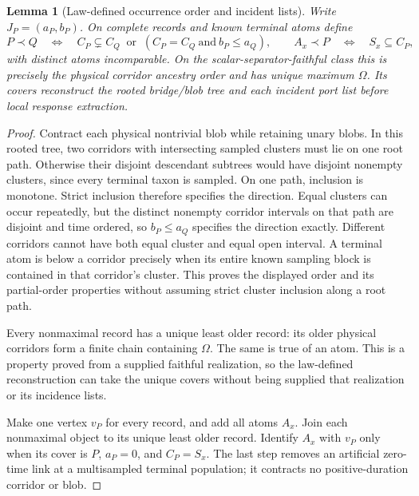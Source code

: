 \documentclass[11pt]{article}
\newtheorem{lemma}[theorem]{Lemma}
\begin{document}
\begin{lemma}[Law-defined occurrence order and incident lists]
\label{lem:supp-occurrence-incidence}
Write $J_P=(a_P,b_P)$.  On complete records and known terminal atoms define
\[
P\prec Q\quad\Longleftrightarrow\quad
C_P\subsetneq C_Q\ \text{ or }\
(C_P=C_Q\ \text{and}\ b_P\le a_Q),
\qquad
A_x\prec P\quad\Longleftrightarrow\quad S_x\subseteq C_P,
\]
with distinct atoms incomparable.  On the scalar-separator-faithful class this is precisely the physical corridor ancestry order and has unique maximum $\Omega$.  Its covers reconstruct the rooted bridge/blob tree and each incident port list before local response extraction.
\end{lemma}

\begin{proof}
Contract each physical nontrivial blob while retaining unary blobs.  In this rooted tree, two corridors with intersecting sampled clusters must lie on one root path.  Otherwise their disjoint descendant subtrees would have disjoint nonempty clusters, since every terminal taxon is sampled.  On one path, inclusion is monotone.  Strict inclusion therefore specifies the direction.  Equal clusters can occur repeatedly, but the distinct nonempty corridor intervals on that path are disjoint and time ordered, so $b_P\le a_Q$ specifies the direction exactly.  Different corridors cannot have both equal cluster and equal open interval.  A terminal atom is below a corridor precisely when its entire known sampling block is contained in that corridor's cluster.  This proves the displayed order and its partial-order properties without assuming strict cluster inclusion along a root path.

Every nonmaximal record has a unique least older record: its older physical corridors form a finite chain containing $\Omega$.  The same is true of an atom.  This is a property proved from a supplied faithful realization, so the law-defined reconstruction can take the unique covers without being supplied that realization or its incidence lists.

Make one vertex $v_P$ for every record, and add all atoms $A_x$.  Join each nonmaximal object to its unique least older record.  Identify $A_x$ with $v_P$ only when its cover is $P$, $a_P=0$, and $C_P=S_x$.  The last step removes an artificial zero-time link at a multisampled terminal population; it contracts no positive-duration corridor or blob.


\end{proof}
\end{document}
